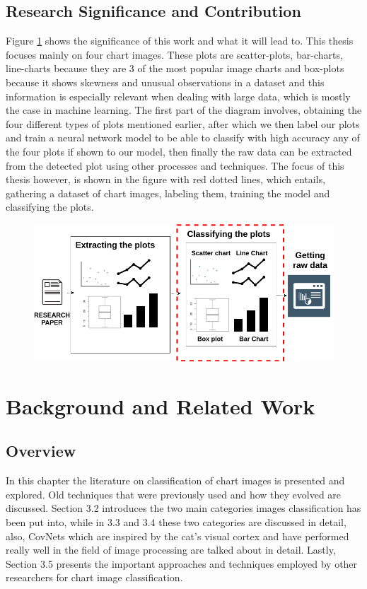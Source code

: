 \documentclass[12pt, a4paper,oneside]{report}
\begin{document}
\section{Research Significance and Contribution}
Figure \ref{fig:vis} shows the significance of this work and what it will lead to. This thesis focuses mainly on four chart images. These plots are scatter-plots, bar-charts, line-charts because they are 3 of the most popular image charts and box-plots because it shows skewness and unusual observations in a dataset and this information is especially relevant when dealing with large data, which is mostly the case in machine learning. The first part of the diagram involves, obtaining  the four different types of plots mentioned earlier, after which we then label our plots and train a neural network model to be able to classify with high accuracy any of the four plots if shown to our model, then finally the raw data can be extracted from the detected plot using other processes and techniques. The focus of this thesis however, is shown in the figure with red dotted lines, which entails, gathering a dataset of chart images, labeling them, training the model and classifying the plots. \\

\begin{figure}[!htb]
\includegraphics [scale=0.48] {vision}
\label{fig:vis}
\end{figure}


\chapter{Background and Related Work}

\section{Overview}
In this chapter the literature on classification of chart images is presented and explored. Old techniques that were previously used and how they evolved are discussed. Section 3.2 introduces the two main categories images classification has been put into, while in 3.3 and 3.4 these two categories are discussed in detail, also, CovNets which are inspired by the cat’s visual cortex and have performed really well in the field of image processing are talked about in detail. Lastly, Section 3.5 presents the important approaches and techniques employed by other researchers for chart image classification.
\end{document}
